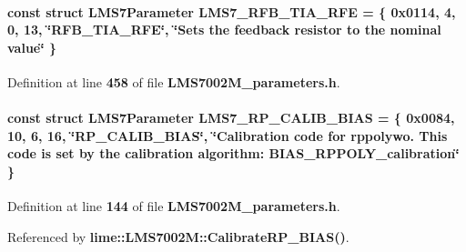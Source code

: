 \paragraph[{L\+M\+S7\+\_\+\+R\+F\+B\+\_\+\+T\+I\+A\+\_\+\+R\+FE}]{\setlength{\rightskip}{0pt plus 5cm}const struct {\bf L\+M\+S7\+Parameter} L\+M\+S7\+\_\+\+R\+F\+B\+\_\+\+T\+I\+A\+\_\+\+R\+FE = \{ 0x0114, 4, 0, 13, \char`\"{}\+R\+F\+B\+\_\+\+T\+I\+A\+\_\+\+R\+F\+E\char`\"{}, \char`\"{}\+Sets the feedback resistor to the nominal value\char`\"{} \}\hspace{0.3cm}{\ttfamily [static]}}\label{LMS7002M__parameters_8h_a39cde8ede4270dedc71121a0964dce7e}


Definition at line {\bf 458} of file {\bf L\+M\+S7002\+M\+\_\+parameters.\+h}.

\paragraph[{L\+M\+S7\+\_\+\+R\+P\+\_\+\+C\+A\+L\+I\+B\+\_\+\+B\+I\+AS}]{\setlength{\rightskip}{0pt plus 5cm}const struct {\bf L\+M\+S7\+Parameter} L\+M\+S7\+\_\+\+R\+P\+\_\+\+C\+A\+L\+I\+B\+\_\+\+B\+I\+AS = \{ 0x0084, 10, 6, 16, \char`\"{}\+R\+P\+\_\+\+C\+A\+L\+I\+B\+\_\+\+B\+I\+A\+S\char`\"{}, \char`\"{}\+Calibration code for rppolywo. This code is set by the calibration algorithm\+: B\+I\+A\+S\+\_\+\+R\+P\+P\+O\+L\+Y\+\_\+calibration\char`\"{} \}\hspace{0.3cm}{\ttfamily [static]}}\label{LMS7002M__parameters_8h_aeaa5f2225f36ab8b36accae04da691e4}


Definition at line {\bf 144} of file {\bf L\+M\+S7002\+M\+\_\+parameters.\+h}.



Referenced by {\bf lime\+::\+L\+M\+S7002\+M\+::\+Calibrate\+R\+P\+\_\+\+B\+I\+A\+S()}.

